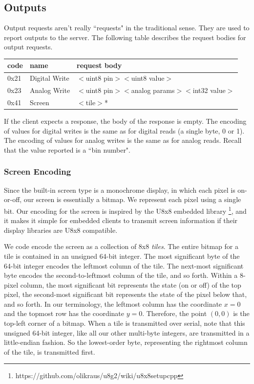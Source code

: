 \documentclass[12pt]{article}
\begin{document}
\subsection{Outputs}
Output requests aren't really ``requests" in the traditional sense.  They are used to report outputs to the server.  The following table describes the request bodies for output requests.

\begin{center}
\begin{tabular}{l l l}
code & name & request body \\ \hline
0x21 & Digital Write & $<$uint8 pin$>$$<$uint8 value$>$ \\
0x23 & Analog Write & $<$uint8 pin$>$$<$analog params$>$$<$int32 value$>$ \\
0x41 & Screen & $<$tile$>$* \\
\end{tabular}
\end{center}

\vspace{5mm}

If the client expects a response, the body of the response is empty.  The encoding of values for digital writes is the same as for digital reads (a single byte, 0 or 1).  The encoding of values for analog writes is the same as for analog reads.  Recall that the value reported is a ``bin number".

\subsubsection{Screen Encoding}
Since the built-in screen type is a monochrome display, in which each pixel is on-or-off, our screen is essentially a bitmap.  We represent each pixel using a single bit.  Our encoding for the screen is inspired by the U8x8 embedded library \footnote{https://github.com/olikraus/u8g2/wiki/u8x8setupcpp}, and it makes it simple for embedded clients to transmit screen information if their display libraries are U8x8 compatible.

We code encode the screen as a collection of 8x8 \textit{tiles}.  The entire bitmap for a tile is contained in an unsigned 64-bit integer.  The most significant byte of the 64-bit integer encodes the leftmost column of the tile.  The next-most significant byte encodes the second-to-leftmost column of the tile, and so forth.  Within a 8-pixel column, the most significant bit represents the state (on or off) of the top pixel, the second-most significant bit represents the state of the pixel below that, and so forth.  In our terminology, the leftmost column has the coordinate $x=0$ and the topmost row has the coordinate $y=0$.  Therefore, the point $(0, 0)$ is the top-left corner of a bitmap.  When a tile is transmitted over serial, note that this unsigned 64-bit integer, like all our other multi-byte integers, are transmitted in a little-endian fashion.  So the lowest-order byte, representing the rightmost column of the tile, is transmitted first.
\end{document}
